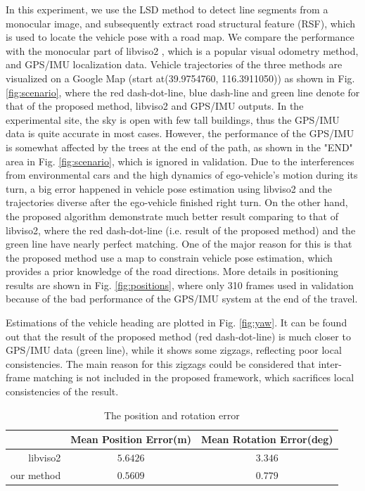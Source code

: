 \documentclass[letterpaper, 10 pt, conference]{ieeeconf}  %
\begin{document}
In this experiment, we use the LSD method \cite{von2012lsd} to detect line segments from a monocular image, and subsequently extract road structural feature (RSF), which is used to locate the vehicle pose with a road map. We compare the performance with the monocular part of libviso2 \cite{Geiger11}\cite{Geiger2013Visual}, which is a popular visual odometry method, and GPS/IMU localization data. Vehicle trajectories of the three methods are visualized on a Google Map (start at(39.9754760, 116.3911050)) as shown in Fig. \ref{fig:scenario}, where the red dash-dot-line, blue dash-line and green line denote for that of the proposed method, libviso2 and GPS/IMU outputs. In the experimental site, the sky is open with few tall buildings, thus the GPS/IMU data is quite accurate in most cases. However, the performance of the GPS/IMU is somewhat affected by the trees at the end of the path, as shown in the "END" area in Fig. \ref{fig:scenario}, which is ignored in validation. Due to the interferences from environmental cars and the high dynamics of ego-vehicle's motion during its turn, a big error happened in vehicle pose estimation using libviso2 and the trajectories diverse after the ego-vehicle finished right turn. On the other hand, the proposed algorithm demonstrate much better result comparing to that of libviso2, where the red dash-dot-line (i.e. result of the proposed method) and the green line have nearly perfect matching. One of the major reason for this is that the proposed method use a map to constrain vehicle pose estimation, which provides a prior knowledge of the road directions. More details in positioning results are shown in Fig. \ref{fig:positions}, where only 310 frames used in validation because of the bad performance of the GPS/IMU system at the end of the travel.

Estimations of the vehicle heading are plotted in Fig. \ref{fig:yaw}. It can be found out that the result of the proposed method (red dash-dot-line) is much closer to GPS/IMU data (green line), while it shows some zigzags, reflecting poor local consistencies. The main reason for this zigzags could be considered that inter-frame matching is not included in the proposed framework, which sacrifices local consistencies of the result.

\begin{table}[t]
\caption{The position and rotation error}
\centering
\begin{tabular}{|r||c||c|}
\hline
&Mean Position Error(m) & Mean Rotation Error(deg)\\
\hline
libviso2 & $5.6426$ & $3.346$\\
\hline
our method & $0.5609$ & $0.779$\\
\hline
\end{tabular}
\label{table:Error_Result}
\end{table}
\end{document}
